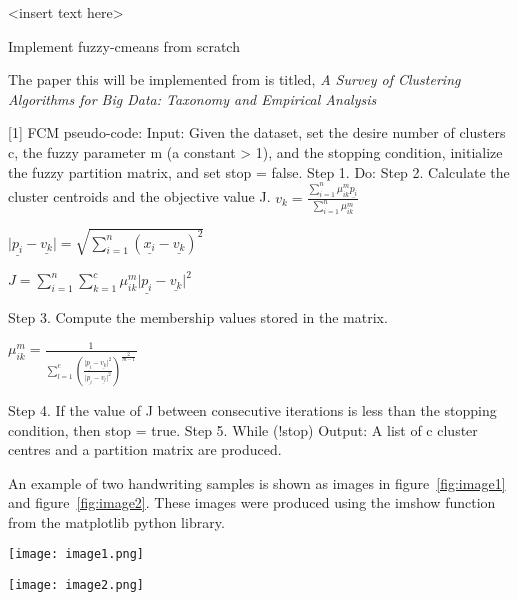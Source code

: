 <insert text here>

Implement fuzzy-cmeans from scratch

The paper this will be implemented from is titled, \textit{A Survey of Clustering Algorithms for Big Data: Taxonomy and Empirical Analysis}


[1]  
FCM pseudo-code:  
Input: Given the dataset, set the desire number of clusters c, the fuzzy parameter m (a constant > 1), and the stopping condition, initialize the fuzzy partition matrix, and set stop = false.  
Step 1. Do:  
Step 2. Calculate the cluster centroids and the objective value J.  
${v_{k}=\frac{\sum_{i=1}^n{{\mu^{m}_{{i}{k}}{{\underline{p_{i}}}}}}}{\sum_{i=1}^n{{\mu^{m}_{{i}{k}}}}}}$ 
   
     
${{\vert{\underline{p_{i}}}-{\underline{v_{k}}}\vert}=\sqrt{\sum_{i=1}^{n}{({\underline{x_{i}}}-{\underline{v_{k}}})^2}}}$  
  

${J=\sum_{i=1}^{n}{\sum_{k=1}^{c}{\mu^{m}_{{i}{k}}{\vert{\underline{p_{i}}}-{\underline{v_{k}}}\vert^{2}}}}}$  
  

Step 3. Compute the membership values stored in the matrix.  

${{\mu^{m}_{{i}{k}}}=\frac{1}{\sum_{l=1}^{c}{(\frac{{\vert{\underline{p_{i}}}-{\underline{v_{k}}}\vert^{2}}}{{\vert{\underline{p_{i}}}-{\underline{v_{l}}}\vert^{2}}})}^{\frac{2}{m-1}}}}$
  
    
Step 4. If the value of J between consecutive iterations is less than the stopping condition, then stop = true.  
Step 5. While (!stop)  
Output: A list of c cluster centres and a partition matrix are produced.   


An example of two handwriting samples is shown as images in figure~\ref{fig:image1} and figure~\ref{fig:image2}. These images were produced using the imshow function from the matplotlib python library.\newline

\begin{center}
\texttt{[image: image1.png]}
\end{center}

\begin{center}
\texttt{[image: image2.png]}
\end{center}    
        